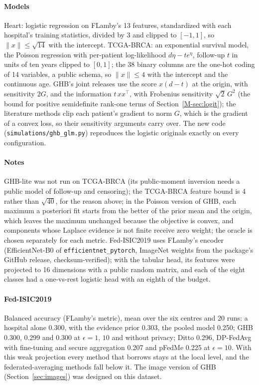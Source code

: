 \documentclass[acmsmall,screen,nonacm]{acmart}
\theoremstyle{acmdefinition}
\begin{document}
\paragraph{Models} Heart: logistic regression on FLamby's 13 features, standardized with each hospital's training statistics, divided by 3 and clipped to $[-1,1]$, so $\|x\|\le\sqrt{14}$ with the intercept. TCGA-BRCA: an exponential survival model, the Poisson regression with per-patient log-likelihood $d\eta-t e^{\eta}$, follow-up $t$ in units of ten years clipped to $[0,1]$; the 38 binary columns are the one-hot coding of 14 variables, a public schema, so $\|x\|\le4$ with the intercept and the continuous age. GHB's joint releases use the score $x(d-t)$ at the origin, with sensitivity $2G$, and the information $t\,xx^\top$, with Frobenius sensitivity $\sqrt2\,G^2$ (the bound for positive semidefinite rank-one terms of Section~\ref{M-sec:logit}); the literature methods clip each patient's gradient to norm $G$, which is the gradient of a convex loss, so their sensitivity arguments carry over. The new code (\texttt{simulations/ghb\_glm.py}) reproduces the logistic originals exactly on every configuration.

\paragraph{Notes} GHB-lite was not run on TCGA-BRCA (its public-moment inversion needs a public model of follow-up and censoring); the TCGA-BRCA feature bound is 4 rather than $\sqrt{40}$, for the reason above; in the Poisson version of GHB, each maximum a posteriori fit starts from the better of the prior mean and the origin, which leaves the maximum unchanged because the objective is convex, and components whose Laplace evidence is not finite receive zero weight; the oracle is chosen separately for each metric. Fed-ISIC2019 uses FLamby's encoder (EfficientNet-B0 of \texttt{efficientnet\_pytorch}, ImageNet weights from the package's GitHub release, checksum-verified); with the tabular head, its features were projected to 16 dimensions with a public random matrix, and each of the eight classes had a one-vs-rest logistic head with an eighth of the budget.

\paragraph{Fed-ISIC2019} Balanced accuracy (FLamby's metric), mean over the six centres and 20 runs: a hospital alone 0.300, with the evidence prior 0.303, the pooled model 0.250; GHB 0.300, 0.299 and 0.300 at $\epsilon=1$, $10$ and without privacy; Ditto \cite{li2021ditto} 0.296, DP-FedAvg \cite{mcmahan2018learning} with fine-tuning and secure aggregation \cite{bonawitz2017practical} 0.207 and pFedMe \cite{tdinh2020personalized} 0.225 at $\epsilon=10$. With this weak projection every method that borrows stays at the local level, and the federated-averaging methods fall below it. The image version of GHB (Section~\ref{sec:images}) was designed on this dataset.
\end{document}
